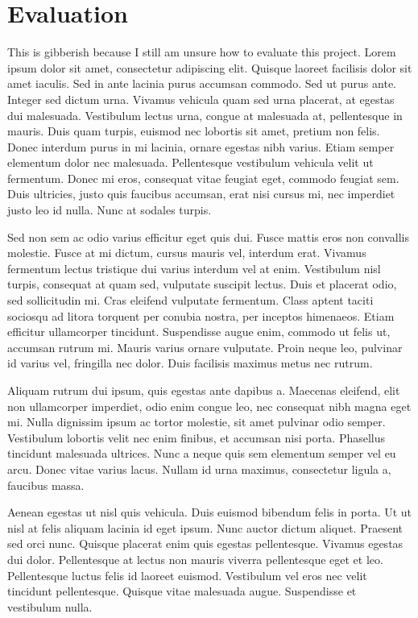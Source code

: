 \section{Evaluation}
This is gibberish because I still am unsure how to evaluate this project.  Lorem ipsum dolor sit amet, consectetur adipiscing elit. Quisque laoreet facilisis dolor sit amet iaculis. Sed in ante lacinia purus accumsan commodo. Sed ut purus ante. Integer sed dictum urna. Vivamus vehicula quam sed urna placerat, at egestas dui malesuada. Vestibulum lectus urna, congue at malesuada at, pellentesque in mauris. Duis quam turpis, euismod nec lobortis sit amet, pretium non felis. Donec interdum purus in mi lacinia, ornare egestas nibh varius. Etiam semper elementum dolor nec malesuada. Pellentesque vestibulum vehicula velit ut fermentum. Donec mi eros, consequat vitae feugiat eget, commodo feugiat sem. Duis ultricies, justo quis faucibus accumsan, erat nisi cursus mi, nec imperdiet justo leo id nulla. Nunc at sodales turpis.

Sed non sem ac odio varius efficitur eget quis dui. Fusce mattis eros non convallis molestie. Fusce at mi dictum, cursus mauris vel, interdum erat. Vivamus fermentum lectus tristique dui varius interdum vel at enim. Vestibulum nisl turpis, consequat at quam sed, vulputate suscipit lectus. Duis et placerat odio, sed sollicitudin mi. Cras eleifend vulputate fermentum. Class aptent taciti sociosqu ad litora torquent per conubia nostra, per inceptos himenaeos. Etiam efficitur ullamcorper tincidunt. Suspendisse augue enim, commodo ut felis ut, accumsan rutrum mi. Mauris varius ornare vulputate. Proin neque leo, pulvinar id varius vel, fringilla nec dolor. Duis facilisis maximus metus nec rutrum.

Aliquam rutrum dui ipsum, quis egestas ante dapibus a. Maecenas eleifend, elit non ullamcorper imperdiet, odio enim congue leo, nec consequat nibh magna eget mi. Nulla dignissim ipsum ac tortor molestie, sit amet pulvinar odio semper. Vestibulum lobortis velit nec enim finibus, et accumsan nisi porta. Phasellus tincidunt malesuada ultrices. Nunc a neque quis sem elementum semper vel eu arcu. Donec vitae varius lacus. Nullam id urna maximus, consectetur ligula a, faucibus massa.

Aenean egestas ut nisl quis vehicula. Duis euismod bibendum felis in porta. Ut ut nisl at felis aliquam lacinia id eget ipsum. Nunc auctor dictum aliquet. Praesent sed orci nunc. Quisque placerat enim quis egestas pellentesque. Vivamus egestas dui dolor. Pellentesque at lectus non mauris viverra pellentesque eget et leo. Pellentesque luctus felis id laoreet euismod. Vestibulum vel eros nec velit tincidunt pellentesque. Quisque vitae malesuada augue. Suspendisse et vestibulum nulla.

